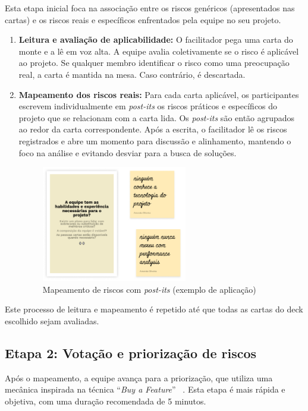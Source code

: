 \documentclass[
	12pt,
	openright,
	twoside,
	a4paper,
	english,
	brazil
	]{abntex2}
\begin{document}
Esta etapa inicial foca na associação entre os riscos genéricos (apresentados nas cartas) e os riscos reais e específicos enfrentados pela equipe no seu projeto.

\begin{enumerate}
  \item \textbf{Leitura e avaliação de aplicabilidade:} O facilitador pega uma carta do monte e a lê em voz alta. A equipe avalia coletivamente se o risco é aplicável ao projeto. Se qualquer membro identificar o risco como uma preocupação real, a carta é mantida na mesa. Caso contrário, é descartada.
  \item \textbf{Mapeamento dos riscos reais:} Para cada carta aplicável, os participantes escrevem individualmente em \textit{post-its} os riscos práticos e específicos do projeto que se relacionam com a carta lida. Os \textit{post-its} são então agrupados ao redor da carta correspondente. Após a escrita, o facilitador lê os riscos registrados e abre um momento para discussão e alinhamento, mantendo o foco na análise e evitando desviar para a busca de soluções.
  \begin{figure}[H]
      \centering
      \caption{\label{mapeamento-riscos-postits} Mapeamento de riscos com \textit{post-its} (exemplo de aplicação)}
      \includegraphics[width=0.6\textwidth]{mapeamento-riscos-postits}
  \end{figure}
\end{enumerate}
Este processo de leitura e mapeamento é repetido até que todas as cartas do deck escolhido sejam avaliadas.

\subsection{Etapa 2: Votação e priorização de riscos}
\label{sec:priorizacao-riscos-cap5}

Após o mapeamento, a equipe avança para a priorização, que utiliza uma mecânica inspirada na técnica “\textit{Buy a Feature}” ~\cite{productplan-buyafeature}. Esta etapa é mais rápida e objetiva, com uma duração recomendada de 5 minutos.
\end{document}
